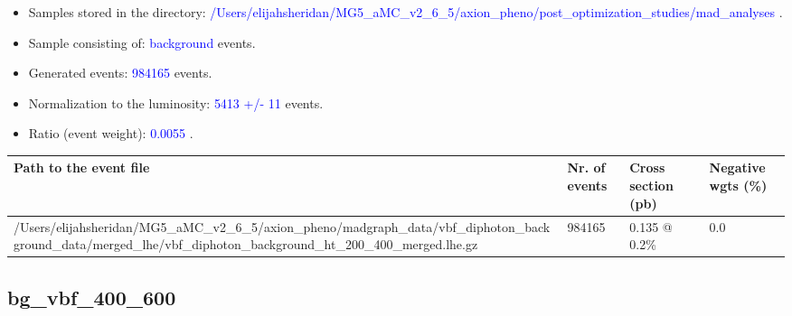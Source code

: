 \documentclass[a4paper, 10pt]{article}
\begin{document}
\begin{itemize}
  \item Samples stored in the directory: \textcolor{blue}{/\-Users/\-elijahsheridan/\-MG5\_aMC\_v2\_6\_5/\-axion\_pheno/\-post\_optimization\_studies/\-mad\_analyses} .
   \item Sample consisting of: \textcolor{blue}{background}  events.
   \item Generated events: \textcolor{blue}{984165 }  events.
   \item Normalization to the luminosity: \textcolor{blue}{5413}\textcolor{blue}{ +/\-- }\textcolor{blue}{11 }  events.
   \item Ratio (event weight): \textcolor{blue}{0.0055 } .  
 
\end{itemize}
\begin{table}[H]
  \begin{center}
    \begin{tabular}{|m{55.0mm}|m{25.0mm}|m{30.0mm}|m{30.0mm}|}
      \hline
      {\cellcolor{yellow}         Path to the event file}& {\cellcolor{yellow}         Nr. of events}& {\cellcolor{yellow}         Cross section (pb)}& {\cellcolor{yellow}         Negative wgts (\%)}\\
      \hline
      {\cellcolor{white}          /\-Users/\-elijahsheridan/\-MG5\_aMC\_v2\_6\_5/\-axion\_pheno/\-madgraph\_data/\-vbf\_diphoton\_background\_data/\-merged\_lhe/\-vbf\_diphoton\_background\_ht\_200\_400\_merged.lhe.gz}& {\cellcolor{white}          984165}& {\cellcolor{white}          0.135 @ 0.2\%}& {\cellcolor{white}          0.0}\\
\hline
    \end{tabular}
  \end{center}
\end{table}

\subsection{ bg\_vbf\_400\_600}
\end{document}
